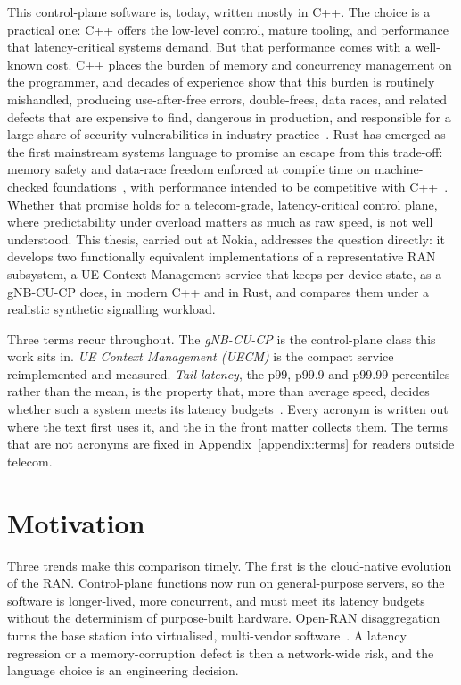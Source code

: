 \documentclass[english,oneside,a4paper,censored,csm,software-track-2020]{HYthesisML}
\begin{document}
This control-plane software is, today, written mostly in C++. The choice is a
practical one: C++ offers the low-level control, mature tooling, and performance that
latency-critical systems demand. But that performance comes with a well-known cost. C++
places the burden of memory and concurrency management on the programmer, and decades of
experience show that this burden is routinely mishandled, producing use-after-free errors,
double-frees, data races, and related defects that are expensive to find, dangerous in
production, and responsible for a large share of security vulnerabilities in industry
practice~\cite{msrc2019memory,google2022android}. Rust has emerged as the first mainstream
systems language to promise an escape from this trade-off: memory safety and data-race
freedom enforced at compile time on machine-checked
foundations~\cite{klabnik2023rust,jung2018rustbelt}, with performance intended to be
competitive with C++~\cite{balasubramanian2017rust}. Whether that promise holds for a
telecom-grade, latency-critical control plane, where predictability under overload matters
as much as raw speed, is not well understood. This thesis, carried out at Nokia, addresses
the question directly: it develops two functionally equivalent implementations of a
representative RAN subsystem, a UE Context Management service that keeps per-device
state, as a gNB-CU-CP does, in modern C++ and in Rust, and compares them under a realistic
synthetic signalling workload.


Three terms recur throughout. The \emph{gNB-CU-CP} is the control-plane class this work sits in.
\emph{UE Context Management (UECM)} is the compact service reimplemented and measured.
\emph{Tail latency}, the p99, p99.9 and p99.99 percentiles rather than the mean, is the property that,
more than average speed, decides whether such a system meets its
latency budgets~\cite{dean2013tail,barroso2017microseconds}. Every acronym is written out where the
text first uses it, and the \nomname{} in the front matter collects them. The terms that are not
acronyms are fixed in Appendix~\ref{appendix:terms} for readers outside telecom.

\section{Motivation}\label{sec:motivation}
Three trends make this comparison timely. The first is the cloud-native
evolution of the RAN. Control-plane functions now run on general-purpose
servers, so the software is longer-lived, more concurrent, and must meet
its latency budgets without the determinism of purpose-built hardware.
Open-RAN disaggregation turns the base station into virtualised,
multi-vendor software~\cite{polese2023oran}. A latency regression or a
memory-corruption defect is then a network-wide risk, and the language
choice is an engineering decision.
\end{document}
